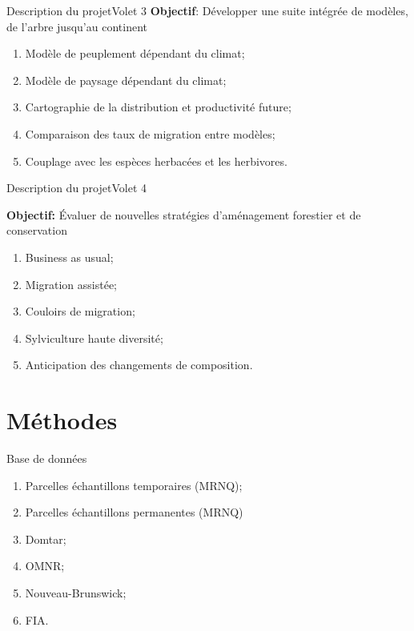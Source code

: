 \documentclass{eecslides}
\begin{document}
	\begin{frame}{Description du projet}{Volet 3}
	\textbf{Objectif}: Développer une suite intégrée de modèles, de l'arbre jusqu'au continent 

		\begin{enumerate}
			\item Modèle de peuplement dépendant du climat;
			\item Modèle de paysage dépendant du climat;
			\item Cartographie de la distribution et productivité future;
			\item Comparaison des taux de migration entre modèles;
			\item Couplage avec les espèces herbacées et les herbivores.
		\end{enumerate}
	\end{frame}

	
	\begin{frame}{Description du projet}{Volet 4}

	\textbf{Objectif:} Évaluer de nouvelles stratégies d'aménagement forestier et de conservation

		\begin{enumerate}
			\item Business as usual;
			\item Migration assistée;
			\item Couloirs de migration;
			\item Sylviculture haute diversité;
			\item Anticipation des changements de composition.	
		\end{enumerate}
	\end{frame}

\section{Méthodes}

	\begin{frame}{Base de données}
		\begin{enumerate}
			\item Parcelles échantillons temporaires (MRNQ);
			\item Parcelles échantillons permanentes (MRNQ)
			\item Domtar;
			\item OMNR;
			\item Nouveau-Brunswick;
			\item FIA.
		\end{enumerate}
	\end{frame}
\end{document}
